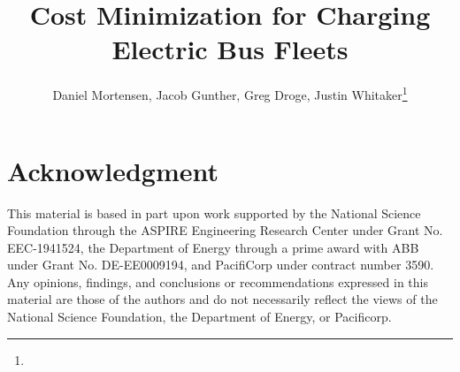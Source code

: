 \documentclass[wevj,article,submit,moreauthors]{Definitions/mdpi}
\begin{document}
\title{Cost Minimization for Charging Electric Bus Fleets}
\author{Daniel Mortensen, Jacob Gunther, Greg Droge, Justin Whitaker\thanks{}}

%
{}

\maketitle 









\section*{Acknowledgment}This material is based in part upon work supported by the National Science Foundation through the ASPIRE Engineering Research Center under Grant No. EEC-1941524, the Department of Energy through a prime award with ABB under Grant No. DE-EE0009194, and PacifiCorp under contract number 3590. Any opinions, findings, and conclusions or recommendations expressed in this material are those of the authors and do not necessarily reflect the views of the National Science Foundation, the Department of Energy, or Pacificorp.
\newpage
\printbibliography
\end{document}
